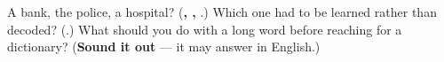 \begin{tcolorbox}[breakable,colback=teal!4,colframe=teal!35!black,title={Before you move on}]
A bank, the police, a hospital? (\textbf{, , }.) Which one had to be learned rather than decoded? (\textbf{}.) What should you do with a long word before reaching for a dictionary? (\textbf{Sound it out} — it may answer in English.)
\end{tcolorbox}
